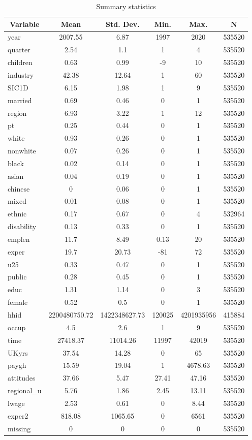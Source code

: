 
\begin{table}[htbp]\centering \caption{Summary statistics \label{sumstats}}
\begin{tabular}{l c c c c c}\hline\hline
\multicolumn{1}{c}{\textbf{Variable}} & \textbf{Mean}
 & \textbf{Std. Dev.}& \textbf{Min.} &  \textbf{Max.} & \textbf{N}\\ \hline
year & 2007.55 & 6.87 & 1997 & 2020 & 535520\\
quarter & 2.54 & 1.1 & 1 & 4 & 535520\\
children & 0.63 & 0.99 & -9 & 10 & 535520\\
industry & 42.38 & 12.64 & 1 & 60 & 535520\\
SIC1D & 6.15 & 1.98 & 1 & 9 & 535520\\
married & 0.69 & 0.46 & 0 & 1 & 535520\\
region & 6.93 & 3.22 & 1 & 12 & 535520\\
pt & 0.25 & 0.44 & 0 & 1 & 535520\\
white & 0.93 & 0.26 & 0 & 1 & 535520\\
nonwhite & 0.07 & 0.26 & 0 & 1 & 535520\\
black & 0.02 & 0.14 & 0 & 1 & 535520\\
asian & 0.04 & 0.19 & 0 & 1 & 535520\\
chinese & 0 & 0.06 & 0 & 1 & 535520\\
mixed & 0.01 & 0.08 & 0 & 1 & 535520\\
ethnic & 0.17 & 0.67 & 0 & 4 & 532964\\
disability & 0.13 & 0.33 & 0 & 1 & 535520\\
emplen & 11.7 & 8.49 & 0.13 & 20 & 535520\\
exper & 19.7 & 20.73 & -81 & 72 & 535520\\
u25 & 0.33 & 0.47 & 0 & 1 & 535520\\
public & 0.28 & 0.45 & 0 & 1 & 535520\\
educ & 1.31 & 1.14 & 0 & 3 & 535520\\
female & 0.52 & 0.5 & 0 & 1 & 535520\\
hhid & 2200480750.72 & 1422348627.73 & 120025 & 4201935956 & 415884\\
occup & 4.5 & 2.6 & 1 & 9 & 535520\\
time & 27418.37 & 11014.26 & 11997 & 42019 & 535520\\
UKyrs & 37.54 & 14.28 & 0 & 65 & 535520\\
paygh & 15.59 & 19.04 & 1 & 4678.63 & 535520\\
attitudes & 37.66 & 5.47 & 27.41 & 47.16 & 535520\\
regional\_u & 5.76 & 1.86 & 2.45 & 13.11 & 535520\\
lwage & 2.53 & 0.61 & 0 & 8.44 & 535520\\
exper2 & 818.08 & 1065.65 & 0 & 6561 & 535520\\
missing & 0 & 0 & 0 & 0 & 535520\\
\hline\end{tabular}
\label{tab:sumstats}
\end{table}
